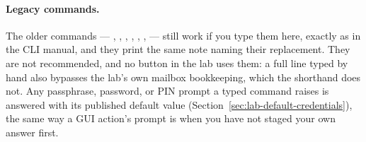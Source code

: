 \paragraph{Legacy commands.} The older commands --- ,
, , , , ,  --- still work if you type them
here, exactly as in the CLI manual, and they print the same note naming their
replacement. They are not recommended, and no button in the lab uses them: a
full  line typed by hand also bypasses the
lab's own mailbox bookkeeping, which the shorthand does not. Any passphrase,
password, or PIN prompt a typed command raises is answered with its
published default value (Section~\ref{sec:lab-default-credentials}), the
same way a GUI action's prompt is when you have not staged your own
answer first.
